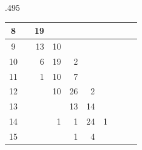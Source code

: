 \begin{table}
\begin{subtable}{.495\linewidth}
{\begin{tabular}{|c|lllllllll|}
			8                                                                              & \multicolumn{1}{r|}{}   & \multicolumn{1}{r|}{19} & \multicolumn{1}{r|}{}   & \multicolumn{1}{r|}{}   & \multicolumn{1}{r|}{}   & \multicolumn{1}{r|}{}   & \multicolumn{1}{r|}{}   & \multicolumn{1}{r|}{}   &                         \\ \hline
			9                                                                              & \multicolumn{1}{r|}{}   & \multicolumn{1}{r|}{13} & \multicolumn{1}{r|}{10} & \multicolumn{1}{r|}{}   & \multicolumn{1}{r|}{}   & \multicolumn{1}{r|}{}   & \multicolumn{1}{r|}{}   & \multicolumn{1}{r|}{}   &                         \\ \hline
			10                                                                             & \multicolumn{1}{r|}{}   & \multicolumn{1}{r|}{6}  & \multicolumn{1}{r|}{19} & \multicolumn{1}{r|}{2}  & \multicolumn{1}{r|}{}   & \multicolumn{1}{r|}{}   & \multicolumn{1}{r|}{}   & \multicolumn{1}{r|}{}   &                         \\ \hline
			11                                                                             & \multicolumn{1}{r|}{}   & \multicolumn{1}{r|}{1}  & \multicolumn{1}{r|}{10} & \multicolumn{1}{r|}{7}  & \multicolumn{1}{r|}{}   & \multicolumn{1}{r|}{}   & \multicolumn{1}{r|}{}   & \multicolumn{1}{r|}{}   &                         \\ \hline
			12                                                                             & \multicolumn{1}{r|}{}   & \multicolumn{1}{r|}{}   & \multicolumn{1}{r|}{10} & \multicolumn{1}{r|}{26} & \multicolumn{1}{r|}{2}  & \multicolumn{1}{r|}{}   & \multicolumn{1}{r|}{}   & \multicolumn{1}{r|}{}   &                         \\ \hline
			13                                                                             & \multicolumn{1}{r|}{}   & \multicolumn{1}{r|}{}   & \multicolumn{1}{r|}{}   & \multicolumn{1}{r|}{13} & \multicolumn{1}{r|}{14} & \multicolumn{1}{r|}{}   & \multicolumn{1}{r|}{}   & \multicolumn{1}{r|}{}   &                         \\ \hline
			14                                                                             & \multicolumn{1}{r|}{}   & \multicolumn{1}{r|}{}   & \multicolumn{1}{r|}{1}  & \multicolumn{1}{r|}{1}  & \multicolumn{1}{r|}{24} & \multicolumn{1}{r|}{1}  & \multicolumn{1}{r|}{}   & \multicolumn{1}{r|}{}   &                         \\ \hline
			15                                                                             & \multicolumn{1}{r|}{}   & \multicolumn{1}{r|}{}   & \multicolumn{1}{r|}{}   & \multicolumn{1}{r|}{1}  & \multicolumn{1}{r|}{4}  & \multicolumn{1}{r|}{}   & \multicolumn{1}{r|}{}   & \multicolumn{1}{r|}{}   &                         \\ \hline

\end{tabular}}
\end{subtable}
\end{table}
